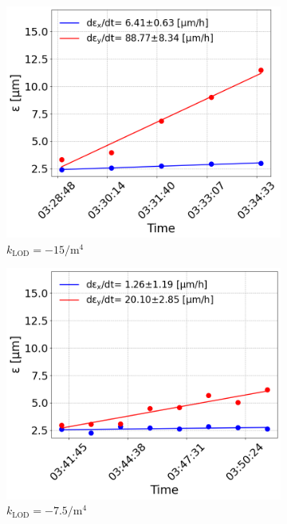 \begin{figure}[htp]
    \begin{subfigure}{.45\textwidth}
        \centering
        \includegraphics[width=.95\linewidth]{images/app_c/emit_vs_time_Set1_coast5.png}  
        \caption{$k_\mathrm{LOD}=-15  \mathrm{/m^{4}}$}
    \end{subfigure}
    \begin{subfigure}{.45\textwidth}
            \centering
            \includegraphics[width=.95\linewidth]{images/app_c/emit_vs_time_Set1_coast6.png}  
            \caption{$k_\mathrm{LOD}=-7.5  \mathrm{/m^{4}}$}
    \end{subfigure}
    \begin{subfigure}{.45\textwidth}

\end{subfigure}
\end{figure}
